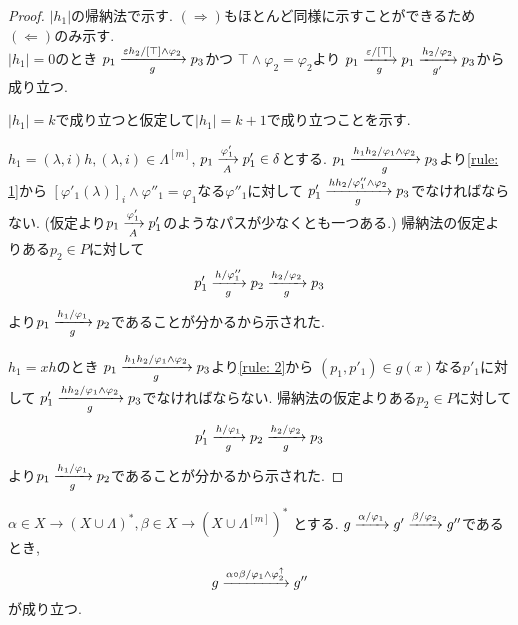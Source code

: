 \documentclass[uplatex,dvipdfmx,a4j]{jsreport}
\begin{document}
  \begin{proof}
    $|h_1|$の帰納法で示す.
    $(\Rightarrow)$もほとんど同様に示すことができるため
    $(\Leftarrow)$のみ示す. \\
    $|h_1| = 0$のとき
    $p_1 \transarrow{\varepsilon h_2 / [\top] \land \varphi_2}{g} p_3$かつ
    $\top \land \varphi_2 = \varphi_2$より
    $p_1 \transarrow{\varepsilon / [\top]}{g} p_1 \transarrow{h_2 / \varphi_2}{g'} p_3$から成り立つ.

    $|h_1| = k$で成り立つと仮定して$|h_1| = k + 1$で成り立つことを示す.

    $h_1 = (\lambda, i) h, (\lambda, i) \in \Lambda^{[m]}$,
    $p_1 \transarrow{\varphi'_1}{A} p'_1 \in \delta$とする.
    $p_1 \transarrow{h_1 h_2 / \varphi_1 \land \varphi_2}{g} p_3$より\ref{rule: 1}から
    $[\varphi'_1(\lambda)]_i \land \varphi''_1 = \varphi_1$なる$\varphi''_1$に対して
    $p'_1 \transarrow{h h_2 / \varphi''_1 \land \varphi_2}{g} p_3$でなければならない.
    (仮定より$p_1 \transarrow{\varphi'_1}{A} p'_1$のようなパスが少なくとも一つある.)
    帰納法の仮定よりある$p_2 \in P$に対して
    \[
      p'_1 \transarrow{h / \varphi''_1}{g} p_2 \transarrow{h_2 / \varphi_2}{g} p_3
    \]
    より$p_1 \transarrow{h_1 / \varphi_1}{g} p_2$であることが分かるから示された.

    $h_1 = x h$のとき
    $p_1 \transarrow{h_1 h_2 / \varphi_1 \land \varphi_2}{g} p_3$より\ref{rule: 2}から
    $(p_1, p'_1) \in g(x)$なる$p'_1$に対して
    $p'_1 \transarrow{h h_2 / \varphi_1 \land \varphi_2}{g} p_3$でなければならない.
    帰納法の仮定よりある$p_2 \in P$に対して
    \[
      p'_1 \transarrow{h / \varphi_1}{g} p_2 \transarrow{h_2 / \varphi_2}{g} p_3
    \]
    より$p_1 \transarrow{h_1 / \varphi_1}{g} p_2$であることが分かるから示された.
  \end{proof}

  \begin{lemma} \label{relation_over_g_is_associative_right}
    $\alpha \in X \rightarrow (X \cup \Lambda)^*, \beta \in X \rightarrow (X \cup \Lambda^{[m]})^*$
    とする.
    $g \transarrow{\alpha / \varphi_1}{} g' \transarrow{\beta / \varphi_2}{} g''$であるとき,
    \[
      g \transarrow{\alpha \circ \beta / \varphi_1 \land \varphi_2^\uparrow}{} g''
    \]
    が成り立つ.
  \end{lemma}
\end{document}
